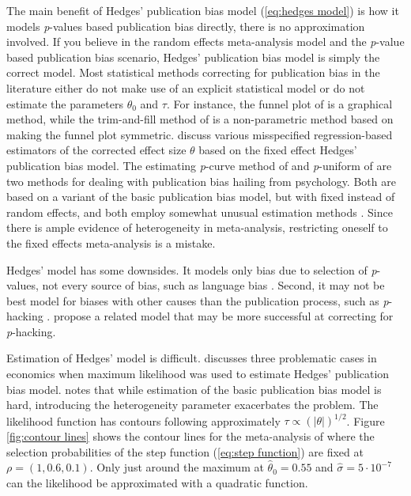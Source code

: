 \documentclass[article]{ajs}
\numberwithin{equation}{section}
\numberwithin{figure}{section}
\theoremstyle{plain}
\theoremstyle{definition}
\theoremstyle{definition}
\theoremstyle{plain}
\renewcommand{\sqrt}[1]{{(#1)^{1/2}}}
\begin{document}
The main benefit of Hedges' publication bias model (\ref{eq:hedges model})
is how it models \emph{p}-values based publication bias directly,
there is no approximation involved. If you believe in the random effects
meta-analysis model and the \emph{p}-value based publication bias
scenario, Hedges' publication bias model is simply the correct model.
Most statistical methods correcting for publication bias in the literature
either do not make use of an explicit statistical model or do not
estimate the parameters $\theta_{0}$ and $\tau$. For instance, the
funnel plot of \citet{Egger1997-rd} is a graphical method, while
the trim-and-fill method of \citet{Duval2000-ct} is a non-parametric
method based on making the funnel plot symmetric. \citet{Stanley2005-ng,stanley2014meta}
discuss various misspecified regression-based estimators of the corrected
effect size $\theta$ based on the fixed effect Hedges' publication
bias model. The estimating \emph{p}-curve method of \citet{Simonsohn2014-cn}
and \emph{p}-uniform of \citet{Van_Assen2015-qs,Van_Aert2016-cu}
are two methods for dealing with publication bias hailing from psychology.
Both are based on a variant of the basic publication bias model, but
with fixed instead of random effects, and both employ somewhat unusual
estimation methods \citep{McShane2016-rb}. Since there is ample evidence
of heterogeneity in meta-analysis, restricting oneself to the fixed
effects meta-analysis is a mistake.

Hedges' model has some downsides. It models only bias due to selection
of \emph{p}-values, not every source of bias, such as language bias
\citep{Egger1998-kj}. Second, it may not be best model for biases
with other causes than the publication process, such as \emph{p}-hacking
\citep{simmons2011false}. \citet{moss2019modelling} propose a related
model that may be more successful at correcting for \emph{p}-hacking. 

Estimation of Hedges' model is difficult. \citet[Section 6.3]{Stanley2005-ng}
discusses three problematic cases in economics when maximum likelihood
was used to estimate Hedges' publication bias model. \citet[Appendix A]{McShane2016-rb}
notes that while estimation of the basic publication bias model is
hard, introducing the heterogeneity parameter exacerbates the problem.
The likelihood function has contours following approximately $\tau\propto\sqrt{|\theta|}$.
Figure \ref{fig:contour lines} shows the contour lines for the meta-analysis
of \citet{Cuddy2018-kp} where the selection probabilities of the
step function (\ref{eq:step function}) are fixed at $\rho=(1,0.6,0.1)$.
Only just around the maximum at $\hat{\theta}_{0}=0.55$ and $\hat{\sigma}=5\cdot10^{-7}$
can the likelihood be approximated with a quadratic function. 
\end{document}
